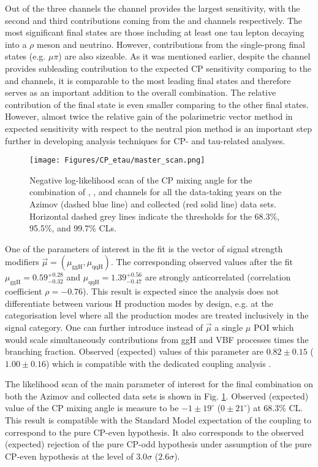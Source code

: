 Out of the three channels the \tata channel provides the largest sensitivity, with the second and third contributions coming from the \mt and \et channels respectively. The most significant final states are those including at least one tau lepton decaying into a $\rho$ meson and neutrino. However, contributions from the single-prong final states (e.g. $\mu\pi$) are also sizeable. As it was mentioned earlier, despite the \et channel provides subleading contribution to the expected CP sensitivity comparing to the \mt and \tata channels, it is comparable to the most leading final states and therefore serves as an important addition to the overall combination. The relative contribution of the \aaa final state is even smaller comparing to the other final states. However, almost twice the relative gain of the polarimetric vector method in expected sensitivity with respect to the neutral pion method is an important step further in developing analysis techniques for CP- and tau-related analyses.

\begin{figure}[h!]
    \centering
    \texttt{[image: Figures/CP\_etau/master\_scan.png]}
    \caption{Negative log-likelihood scan of the CP mixing angle \mixa for the combination of \mt, \et, and \tata channels for all the data-taking years on the Azimov (dashed blue line) and collected (red solid line) data sets. Horizontal dashed grey lines indicate the thresholds for the 68.3\%, 95.5\%, and 99.7\% CLs.}
    \label{fig:master_scan}
\end{figure}

One of the parameters of interest in the fit is the vector of signal strength modifiers $\vec{\mu} = (\mu_\text{ggH}, \mu_\text{qqH})$. The corresponding observed values after the fit $\mu_\text{ggH} = 0.59^{+0.28}_{-0.32}$ and $\mu_\text{qqH} = 1.39^{+0.56}_{-0.47}$ are strongly anticorrelated (correlation coefficient $\rho = -0.76$). This result is expected since the analysis does not differentiate between various H production modes by design, e.g. at the categorisation level where all the production modes are treated inclusively in the signal category. One can further introduce instead of $\vec{\mu}$ a single $\mu$ POI which would scale simultaneously contributions from ggH and VBF processes times the \htt branching fraction. Observed (expected) values of this parameter are $0.82 \pm 0.15$ ($1.00 \pm 0.16$) which is compatible with the dedicated \htt coupling analysis \cite{CMS:2022kdi}. 

The likelihood scan of the main parameter of interest \mixa for the final combination on both the Azimov and collected data sets is shown in Fig. \ref{fig:master_scan}. Observed (expected) value of the CP mixing angle is measure to be $-1\pm19^\circ$ ($0\pm21^\circ$) at 68.3\% CL. This result is compatible with the Standard Model expectation of the \htt coupling to correspond to the pure CP-even hypothesis. It also corresponds to the observed (expected) rejection of the pure CP-odd hypothesis under assumption of the pure CP-even hypothesis at the level of $3.0\sigma$ ($2.6\sigma$). 

